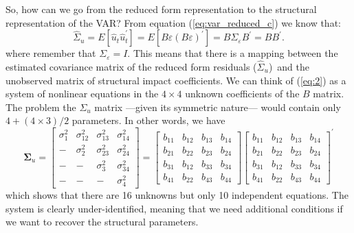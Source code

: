\documentclass[10pt]{article}
\begin{document}
So, how can we go from the reduced form representation to the structural
representation of the VAR? From equation (\ref{eq:var_reduced_c}) we know
that:%
\begin{equation}
\hat{\Sigma}_{u}=E\left[ \hat{u}_{t}\hat{u}_{t}^{\prime }\right] =E\left[
B\varepsilon \left( B\varepsilon \right) ^{\prime }\right] =B\Sigma
_{\varepsilon }B^{\prime }=BB^{\prime }.  \label{eq:2}
\end{equation}%
where remember that $\Sigma _{\varepsilon }=I$. This means that there is a
mapping between the estimated covariance matrix of the reduced form
residuals ($\hat{\Sigma}_{u}$)\ and the unobserved matrix of structural
impact coefficients. We can think of (\ref{eq:2}) as a system of nonlinear
equations in the $4\times 4$ unknown coefficients of the $B$ matrix. The
problem the $\Sigma _{u}$ matrix ---given its symmetric nature--- would
contain only $4+(4\times 3)/2$ parameters. In other words, we have 
\begin{equation*}
\mathbf{\Sigma }_{u}=\left[ 
\begin{array}{cccc}
\sigma _{1}^{2} & \sigma _{12}^{2} & \sigma _{13}^{2} & \sigma _{14}^{2} \\ 
- & \sigma _{2}^{2} & \sigma _{23}^{2} & \sigma _{24}^{2} \\ 
- & - & \sigma _{3}^{2} & \sigma _{34}^{2} \\ 
- & - & - & \sigma _{4}^{2}%
\end{array}%
\right] =\left[ 
\begin{array}{cccc}
b_{11} & b_{12} & b_{13} & b_{14} \\ 
b_{21} & b_{22} & b_{23} & b_{24} \\ 
b_{31} & b_{12} & b_{33} & b_{34} \\ 
b_{41} & b_{22} & b_{43} & b_{44}%
\end{array}%
\right] \left[ 
\begin{array}{cccc}
b_{11} & b_{12} & b_{13} & b_{14} \\ 
b_{21} & b_{22} & b_{23} & b_{24} \\ 
b_{31} & b_{12} & b_{33} & b_{34} \\ 
b_{41} & b_{22} & b_{43} & b_{44}%
\end{array}%
\right] ^{\prime }
\end{equation*}%
which shows that there are 16 unknowns but only 10 independent equations.
The system is clearly under-identified, meaning that we need additional
conditions if we want to recover the structural parameters. 
\end{document}

